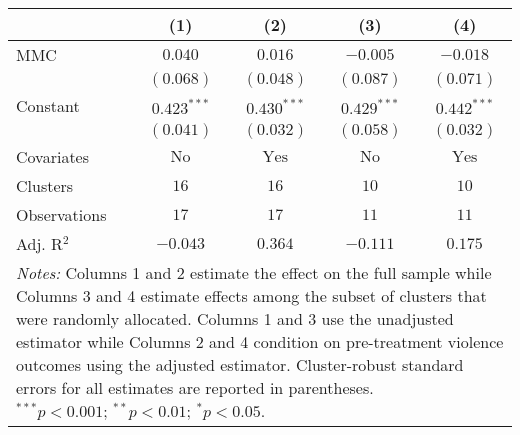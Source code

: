 
\begin{tabular}{l c c c c}
\toprule
 & (1) & (2) & (3) & (4) \\
\midrule
MMC          & $0.040$       & $0.016$        & $-0.005$      & $-0.018$       \\
             & $(0.068)$     & $(0.048)$      & $(0.087)$     & $(0.071)$      \\
Constant     & $0.423^{***}$ & $0.430^{***}$  & $0.429^{***}$ & $0.442^{***}$  \\
             & $(0.041)$     & $(0.032)$      & $(0.058)$     & $(0.032)$      \\
\midrule
Covariates   & $\textrm{No}$ & $\textrm{Yes}$ & $\textrm{No}$ & $\textrm{Yes}$ \\
Clusters     & $16$          & $16$           & $10$          & $10$           \\
Observations & $17$          & $17$           & $11$          & $11$           \\
Adj. R$^2$   & $-0.043$      & $0.364$        & $-0.111$      & $0.175$        \\
\bottomrule
\multicolumn{5}{l}{\scriptsize{\parbox{.5\linewidth}{\vspace{2pt} 
       \textit{Notes:} Columns 1 and 2 estimate the effect on the full sample while Columns 3 
       and 4 estimate effects among the subset of clusters that were randomly allocated.
       Columns 1 and 3 use the unadjusted estimator while Columns 2 and 4 condition on 
       pre-treatment violence outcomes using the adjusted estimator. Cluster-robust 
       standard errors for all estimates are reported in parentheses. \\ $^{***}p<0.001$; $^{**}p<0.01$; $^{*}p<0.05$.}}}
\end{tabular}
